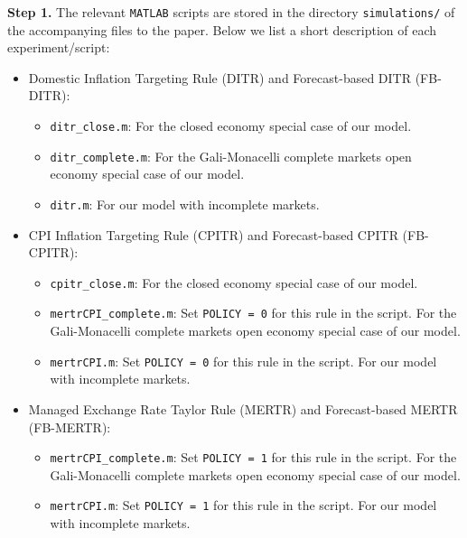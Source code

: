 \documentclass[11pt]{article}
\begin{document}
\noindent\textbf{Step 1.} The relevant \texttt{MATLAB} scripts are stored in the directory \texttt{simulations/} of the accompanying files to the paper. Below we list a short description of each experiment/script:
\begin{itemize}
\item Domestic Inflation Targeting Rule (DITR) and Forecast-based DITR (FB-DITR):
	\begin{itemize}
	\item \texttt{ditr\_{close}.m}: For the closed economy special case of our model.
	\item \texttt{ditr\_complete.m}: For the Gali-Monacelli complete markets open economy special case of our model.
	\item \texttt{ditr.m}: For our model with incomplete markets.
	\end{itemize}
	
\item CPI Inflation Targeting Rule (CPITR) and Forecast-based CPITR (FB-CPITR):
	\begin{itemize}
	\item \texttt{cpitr\_{close}.m}: For the closed economy special case of our model.
	\item \texttt{mertrCPI\_complete.m}: Set \texttt{POLICY = 0} for this rule in the script. For the Gali-Monacelli complete markets open economy special case of our model.
	\item \texttt{mertrCPI.m}: Set \texttt{POLICY = 0} for this rule in the script. For our model with incomplete markets.
	\end{itemize}
	
\item Managed Exchange Rate Taylor Rule (MERTR) and Forecast-based MERTR (FB-MERTR):
	\begin{itemize}
	\item \texttt{mertrCPI\_complete.m}: Set \texttt{POLICY = 1} for this rule in the script.  For the Gali-Monacelli complete markets open economy special case of our model.
	\item \texttt{mertrCPI.m}: Set \texttt{POLICY = 1} for this rule in the script. For our model with incomplete markets.
	\end{itemize}	
	

\end{itemize}
\end{document}
